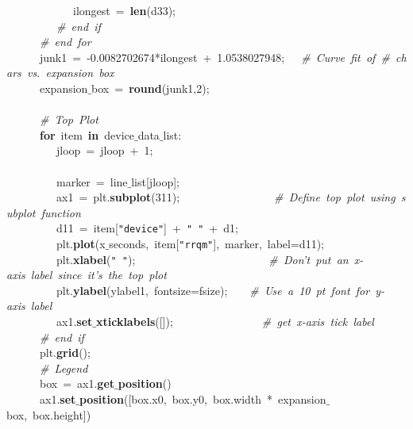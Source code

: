 \mbox{}\ \ \ \ \ \ \ \ \ \ \ \ ilongest\ =\ \textbf{len}(d33); \\
\mbox{}\ \ \ \ \ \ \ \ \ \textit{\#\ end\ if} \\
\mbox{}\ \ \ \ \ \ \textit{\#\ end\ for} \\
\mbox{}\ \ \ \ \ \ junk1\ =\ -0.0082702674*ilongest\ +\ 1.0538027948;\ \ \ \textit{\#\ Curve\ fit\ of\ \#\ chars\ vs.\ expansion\ box} \\
\mbox{}\ \ \ \ \ \ expansion$\_$box\ =\ \textbf{round}(junk1,2); \\
\mbox{}\ \ \ \ \ \  \\
\mbox{}\ \ \ \ \ \ \textit{\#\ Top\ Plot} \\
\mbox{}\ \ \ \ \ \ \textbf{for}\ item\ \textbf{in}\ device$\_$data$\_$list: \\
\mbox{}\ \ \ \ \ \ \ \ \ jloop\ =\ jloop\ +\ 1; \\
\mbox{}\ \ \ \ \ \ \ \ \  \\
\mbox{}\ \ \ \ \ \ \ \ \ marker\ =\ line$\_$list[jloop]; \\
\mbox{}\ \ \ \ \ \ \ \ \ ax1\ =\ plt.\textbf{subplot}(311);\ \ \ \ \ \ \ \ \ \ \ \ \ \ \ \ \ \textit{\#\ Define\ top\ plot\ using\ subplot\ function} \\
\mbox{}\ \ \ \ \ \ \ \ \ d11\ =\ item[\texttt{"{}device"{}}]\ +\ \texttt{"{}\ "{}}\ +\ d1; \\
\mbox{}\ \ \ \ \ \ \ \ \ plt.\textbf{plot}(x$\_$seconds,\ item[\texttt{"{}rrqm"{}}],\ marker,\ label=d11); \\
\mbox{}\ \ \ \ \ \ \ \ \ plt.\textbf{xlabel}(\texttt{"{}\ "{}});\ \ \ \ \ \ \ \ \ \ \ \ \ \ \ \ \ \ \ \ \ \ \ \ \textit{\#\ Don't\ put\ an\ x-axis\ label\ since\ it's\ the\ top\ plot} \\
\mbox{}\ \ \ \ \ \ \ \ \ plt.\textbf{ylabel}(ylabel1,\ fontsize=fsize);\ \ \ \ \textit{\#\ Use\ a\ 10\ pt\ font\ for\ y-axis\ label} \\
\mbox{}\ \ \ \ \ \ \ \ \ ax1.\textbf{set$\_$xticklabels}([]);\ \ \ \ \ \ \ \ \ \ \ \ \ \ \ \ \textit{\#\ get\ x-axis\ tick\ label} \\
\mbox{}\ \ \ \ \ \ \textit{\#\ end\ if} \\
\mbox{}\ \ \ \ \ \ plt.\textbf{grid}(); \\
\mbox{}\ \ \ \ \ \ \textit{\#\ Legend} \\
\mbox{}\ \ \ \ \ \ box\ =\ ax1.\textbf{get$\_$position}() \\
\mbox{}\ \ \ \ \ \ ax1.\textbf{set$\_$position}([box.x0,\ box.y0,\ box.width\ *\ expansion$\_$box,\ box.height]) \\
